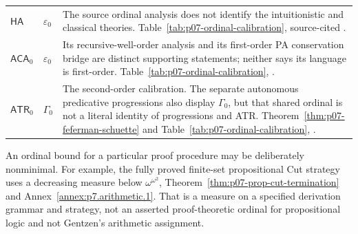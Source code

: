 \begin{longtable}{@{}p{}p{}p{}@{}}
\(\mathsf{HA}\) & \(\varepsilon_0\) &
The source ordinal analysis does not identify the intuitionistic and
classical theories. Table~\ref{tab:p07-ordinal-calibration}, source-cited
\cite{Pohlers2009}. \\
\addlinespace
\(\mathsf{ACA}_0\) & \(\varepsilon_0\) &
Its recursive-well-order analysis and its first-order PA conservation
bridge are distinct supporting statements; neither says its language is
first-order. Table~\ref{tab:p07-ordinal-calibration},
\cite{Simpson2009,Pohlers2009}. \\
\addlinespace
\(\mathsf{ATR}_0\) & \(\Gamma_0\) &
The second-order calibration. The separate autonomous predicative
progressions also display \(\Gamma_0\), but that shared ordinal is not a
literal identity of progressions and ATR.
Theorem~\ref{thm:p07-feferman-schuette} and
Table~\ref{tab:p07-ordinal-calibration},
\cite{Feferman1964,Schuette1977,Simpson2009}. \\
\bottomrule
\end{longtable}
\endgroup

An ordinal bound for a particular proof procedure may be deliberately
nonminimal. For example, the fully proved finite-set propositional Cut
strategy uses a decreasing measure below \(\omega^{\omega^2}\),
Theorem~\ref{thm:p07-prop-cut-termination} and
Annex~\ref{annex:p7.arithmetic.1}. That is a measure on a specified
derivation grammar and strategy, not an asserted proof-theoretic ordinal
for propositional logic and not Gentzen's arithmetic assignment.

